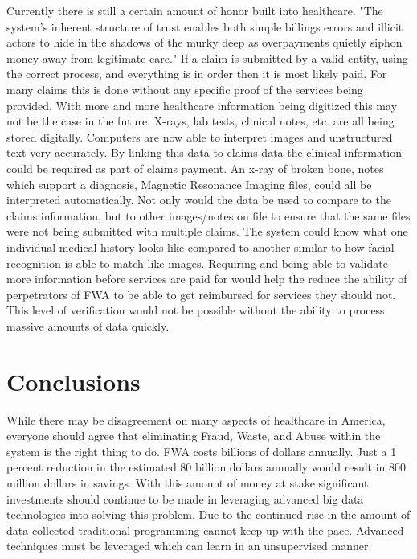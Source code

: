\documentclass[sigconf]{acmart}
\begin{document}
Currently there is still a certain amount of honor built into healthcare.  "The system's inherent structure of trust enables both simple billings errors and illicit actors to hide in the shadows of the murky deep as overpayments quietly siphon money away from legitimate care."\cite{RevCycle}  If a claim is submitted by a valid entity, using the correct process, and everything is in order then it is most likely paid.  For many claims this is done without any specific proof of the services being provided.  With more and more healthcare information being digitized this may not be the case in the future.  X-rays, lab tests, clinical notes, etc. are all being stored digitally.  Computers are now able to interpret images and unstructured text very accurately.  By linking this data to claims data the clinical information could be required as part of claims payment.  An x-ray of broken bone, notes which support a diagnosis, Magnetic Resonance Imaging files, could all be interpreted automatically.  Not only would the data be used to compare to the claims information, but to other images/notes on file to ensure that the same files were not being submitted with multiple claims.  The system could know what one individual medical history looks like compared to another similar to how facial recognition is able to match like images.  Requiring and being able to validate more information before services are paid for would help the reduce the ability of perpetrators of FWA to be able to get reimbursed for services they should not.  This level of verification would not be possible without the ability to process massive amounts of data quickly.  


\section{Conclusions}

While there may be disagreement on many aspects of healthcare in America, everyone should agree that eliminating Fraud, Waste, and Abuse within the system is the right thing to do.  FWA costs billions of dollars annually.  Just a 1 percent reduction in the estimated 80 billion dollars annually would result in 800 million dollars in savings.  With this amount of money at stake significant investments should continue to be made in leveraging advanced big data technologies into solving this problem.  Due to the continued rise in the amount of data collected traditional programming cannot keep up with the pace.  Advanced techniques must be leveraged which can learn in an unsupervised manner.  
\end{document}
